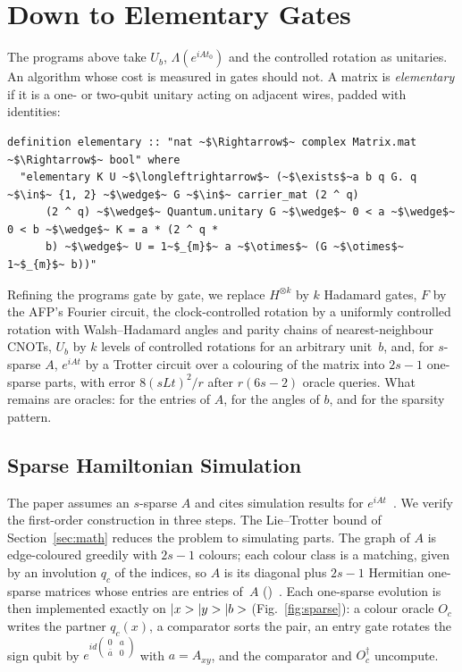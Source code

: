 \section{Down to Elementary Gates}\label{sec:gates}

The programs above take $U_b$, $\Lambda(e^{iAt_0})$ and the controlled rotation as unitaries. An
algorithm whose cost is measured in gates should not. A matrix is \emph{elementary} if it is a one- or
two-qubit unitary acting on adjacent wires, padded with identities:

\begin{lstlisting}[float=tp,caption={Elementary gates},label={lst:elem}]
definition elementary :: "nat ~$\Rightarrow$~ complex Matrix.mat ~$\Rightarrow$~ bool" where
  "elementary K U ~$\longleftrightarrow$~ (~$\exists$~a b q G. q ~$\in$~ {1, 2} ~$\wedge$~ G ~$\in$~ carrier_mat (2 ^ q)
      (2 ^ q) ~$\wedge$~ Quantum.unitary G ~$\wedge$~ 0 < a ~$\wedge$~ 0 < b ~$\wedge$~ K = a * (2 ^ q *
      b) ~$\wedge$~ U = 1~$_{m}$~ a ~$\otimes$~ (G ~$\otimes$~ 1~$_{m}$~ b))"
\end{lstlisting}

Refining the programs gate by gate, we replace $H^{\otimes k}$ by $k$ Hadamard gates, $F$ by the
AFP's Fourier circuit, the clock-controlled rotation by a uniformly controlled rotation with
Walsh--Hadamard angles and parity chains of nearest-neighbour CNOTs, $U_b$ by $k$ levels of
controlled rotations for an arbitrary unit~$b$, and, for $s$-sparse $A$, $e^{iAt}$ by a Trotter
circuit over a colouring of the matrix into $2s-1$ one-sparse parts, with error $8(sLt)^2/r$ after
$r(6s-2)$ oracle queries. What remains are oracles: for the entries of $A$, for the angles of $b$,
and for the sparsity pattern.


\subsection{Sparse Hamiltonian Simulation}\label{sec:sparse}

The paper assumes an $s$-sparse $A$ and cites simulation results for $e^{iAt}$~\cite{berry2007}. We verify
the first-order construction in three steps. The Lie--Trotter bound of Section~\ref{sec:math} reduces the
problem to simulating parts. The graph of $A$ is edge-coloured greedily with $2s-1$ colours; each colour
class is a matching, given by an involution $q_c$ of the indices, so $A$ is its diagonal plus $2s-1$
Hermitian one-sparse matrices whose entries are entries of~$A$ ()~\cite{aharonov2003}.
Each one-sparse evolution is then implemented exactly on $|x>|y>|b>$ (Fig.~\ref{fig:sparse}): a
colour oracle $O_c$ writes the partner $q_c(x)$, a comparator sorts the pair, an entry gate rotates the
sign qubit by $e^{id\left(\begin{smallmatrix}0&a\\\bar a&0\end{smallmatrix}\right)}$ with $a=A_{xy}$, and the
comparator and $O_c^\dagger$ uncompute.

